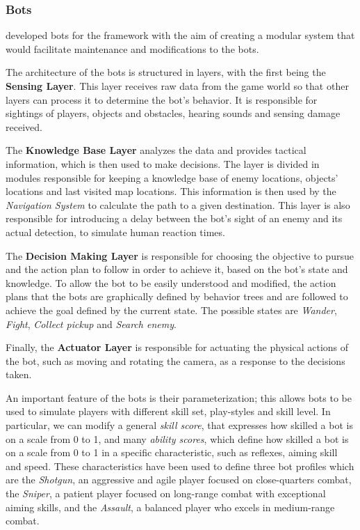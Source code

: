 \subsubsection{Bots}
\label{subsec:bots}

\citeauthor{bari_evolutionary-based_2023} developed bots for the framework with the aim of creating a modular system that would facilitate maintenance and modifications to the bots. \cite{bari_evolutionary-based_2023}

The architecture of the bots is structured in layers, with the first being the \textbf{Sensing Layer}. This layer receives raw data from the game world so that other layers can process it to determine the bot's behavior. It is responsible for sightings of players, objects and obstacles, hearing sounds and sensing damage received.

The \textbf{Knowledge Base Layer} analyzes the data and provides tactical information, which is then used to make decisions. The layer is divided in modules responsible for keeping a knowledge base of enemy locations, objects' locations and last visited map locations. This information is then used by the \textit{Navigation System} to calculate the path to a given destination. This layer is also responsible for introducing a delay between the bot's sight of an enemy and its actual detection, to simulate human reaction times.

The \textbf{Decision Making Layer} is responsible for choosing the objective to pursue and the action plan to follow in order to achieve it, based on the bot's state and knowledge. To allow the bot to be easily understood and modified, the action plans that the bots are graphically defined by behavior trees and are followed to achieve the goal defined by the current state. The possible states are \textit{Wander}, \textit{Fight}, \textit{Collect pickup} and \textit{Search enemy}. 

Finally, the \textbf{Actuator Layer} is responsible for actuating the physical actions of the bot, such as moving and rotating the camera, as a response to the decisions taken.

An important feature of the bots is their parameterization; this allows bots to be used to simulate players with different skill set, play-styles and skill level. In particular, we can modify a general \textit{skill score}, that expresses how skilled a bot is on a scale from 0 to 1, and many \textit{ability scores}, which define how skilled a bot is on a scale from 0 to 1 in a specific characteristic, such as reflexes, aiming skill and speed. These characteristics have been used to define three bot profiles which are the \textit{Shotgun}, an aggressive and agile player focused on close-quarters combat, the \textit{Sniper}, a patient player focused on long-range combat with exceptional aiming skills, and the \textit{Assault}, a balanced player who excels in medium-range combat.

